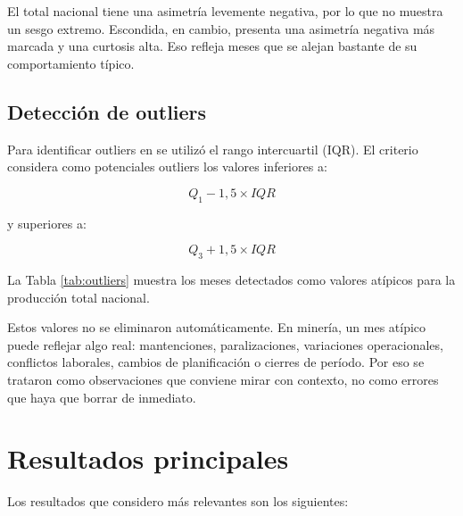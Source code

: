 \documentclass[11pt,letterpaper]{article}
\newcommand{\code}[1]{\texttt{\detokenize{#1}}}
\begin{document}
\begin{table}[H]
\centering
\caption{Asimetría y curtosis de variables seleccionadas}
\label{tab:asimetria}

\end{table}

El total nacional tiene una asimetría levemente negativa, por lo que no muestra un sesgo extremo. Escondida, en cambio, presenta una asimetría negativa más marcada y una curtosis alta. Eso refleja meses que se alejan bastante de su comportamiento típico.

\subsection{Detección de outliers}

Para identificar outliers en \code{total_chile} se utilizó el rango intercuartil (IQR). El criterio considera como potenciales outliers los valores inferiores a:

\[
Q_1 - 1{,}5 \times IQR
\]

y superiores a:

\[
Q_3 + 1{,}5 \times IQR
\]

La Tabla \ref{tab:outliers} muestra los meses detectados como valores atípicos para la producción total nacional.

\begin{table}[H]
\centering
\caption{Meses atípicos detectados para la producción total de Chile}
\label{tab:outliers}

\end{table}

Estos valores no se eliminaron automáticamente. En minería, un mes atípico puede reflejar algo real: mantenciones, paralizaciones, variaciones operacionales, conflictos laborales, cambios de planificación o cierres de período. Por eso se trataron como observaciones que conviene mirar con contexto, no como errores que haya que borrar de inmediato.

\section{Resultados principales}

Los resultados que considero más relevantes son los siguientes:
\end{document}
